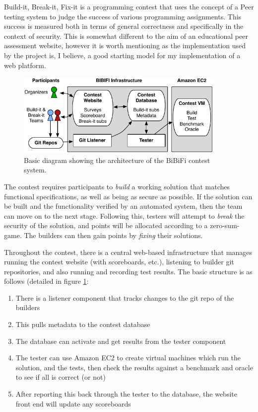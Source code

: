 \documentclass[a4paper,11pt]{report}
\begin{document}
Build-it, Break-it, Fix-it\cite{ruef_build_2016} is a programming contest that uses the concept of a Peer testing system to judge the success of various programming assignments. This success is measured both in terms of general correctness and specifically in the context of security. This is somewhat different to the aim of an educational peer assessment website, however it is worth mentioning as the implementation used by the project is, I believe, a good starting model for my implementation of a web platform.\par
\begin{figure}[ht]
\centering
\includegraphics[width=0.9\textwidth]{fig/bibifi.png}
\caption{\footnotesize Basic diagram showing the architecture of the BiBiFi contest system.}
\label{fig:bibifi}
\end{figure}
The contest requires participants to \textit{build} a working solution that matches functional specifications, as well as being as secure as possible. If the solution can be built and the functionality verified by an automated system, then the team can move on to the next stage. Following this, testers will attempt to \textit{break} the security of the solution, and points will be allocated according to a zero-sum-game. The builders can then gain points by \textit{fixing} their solutions.\par
Throughout the contest, there is a central web-based infrastructure that manages running the contest website (with scoreboards, etc.), listening to builder git repositories, and also running and recording test results. The basic structure is as follows (detailed in figure \ref{fig:bibifi}:
\begin{enumerate}
 \item There is a listener component that tracks changes to the git repo of the builders
 \item This pulls metadata to the contest database
 \item The database can activate and get results from the tester component
 \item The tester can use Amazon EC2 to create virtual machines which run the solution, and the tests, then check the results against a benchmark and oracle to see if all is correct (or not)
 \item After reporting this back through the tester to the database, the website front end will update any scoreboards
\end{enumerate}
\end{document}
